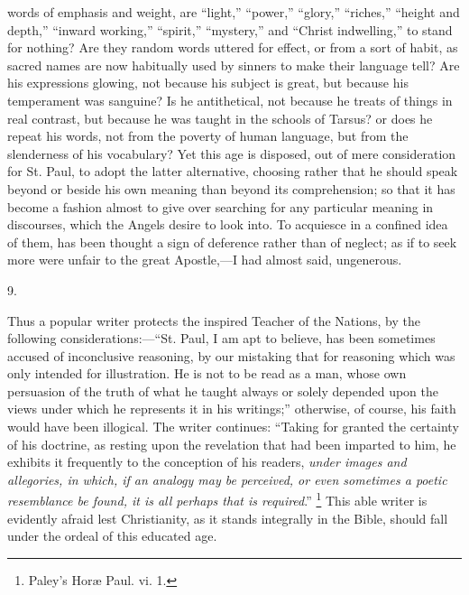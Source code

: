 words of emphasis and weight, are ``light,''
``power,'' ``glory,'' ``riches,'' ``height
and depth,'' ``inward working,'' ``spirit,''
``mystery,'' and ``Christ indwelling,'' to stand for
nothing? Are they random words uttered for effect, or from a sort of
habit, as sacred names are now habitually used by sinners to make
their language tell? Are his expressions glowing, not because his
subject is great, but because his temperament was sanguine? Is he
antithetical, not because he treats of things in real contrast, but
because he was taught in the schools of Tarsus? or does he repeat his
words, not from the poverty of human language, but from the
slenderness of his vocabulary? Yet this age is disposed, out of mere
consideration for St. Paul, to adopt the latter alternative, choosing
rather that he should speak beyond or beside his own meaning than
beyond its comprehension; so that it has become a fashion almost to
give over searching for any particular meaning in discourses, which
the Angels desire to look into. To acquiesce in a confined idea of
them, has been thought a sign of deference rather than of neglect; as
if to seek more were unfair to the great Apostle,—I had almost said,
ungenerous.

9.

Thus a popular writer protects the inspired Teacher of the Nations,
by the following considerations:—``St. Paul, I am apt to
believe, has been sometimes accused of inconclusive reasoning, by our
mistaking that for reasoning which was only intended for
illustration. He is not to be read as a man, whose own persuasion of
the truth of what he taught always or solely depended upon the views
under which he represents it in his writings;'' otherwise, of
course, his faith would have been illogical. The writer continues:
``Taking for granted the certainty of his doctrine, as resting
upon the revelation that had been imparted to him, he exhibits it
frequently to the conception of his readers, \emph{under images and
allegories, in which, if an analogy may be perceived, or even
sometimes a poetic resemblance be found, it is all perhaps that is
required}.'' \footnote{Paley's Horæ
Paul. vi. 1.} This
able writer is evidently afraid lest Christianity, as it stands
integrally in the Bible, should fall under the ordeal of this educated
age.

